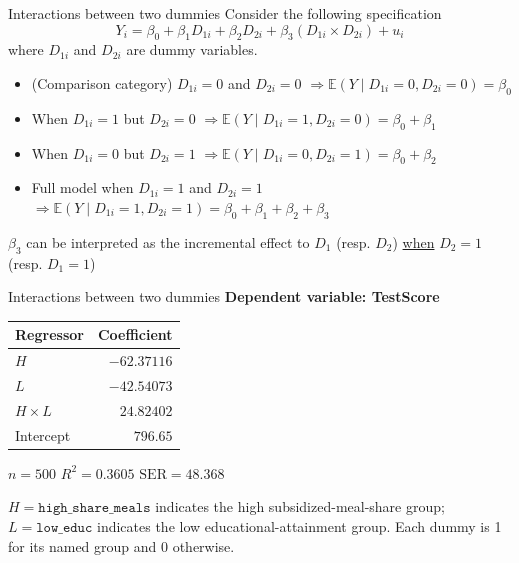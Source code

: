 \documentclass[notes,10pt, aspectratio=169]{beamer}
\begin{document}
\begin{frame}{Interactions between two dummies}
Consider the following specification
\begin{equation*}
    Y_i = \beta_0 + \beta_1 D_{1i} + \beta_2 D_{2i} + \beta_3 (D_{1i} \times D_{2i}) + u_i
\end{equation*}
where $D_{1i}$ and $D_{2i}$ are dummy variables.\\[1em]
\begin{itemize}
    \item (Comparison category) $D_{1i}=0$ and $D_{2i}=0$ $\Rightarrow \mathbb{E}(Y\mid D_{1i}=0, D_{2i}=0) = \beta_0$ 
    \item When $D_{1i}=1$ but $D_{2i}=0$ $\Rightarrow \mathbb{E}(Y\mid D_{1i}=1, D_{2i}=0) = \beta_0 + \beta_1$ 
    \item When $D_{1i}=0$ but $D_{2i}=1$ $\Rightarrow \mathbb{E}(Y\mid D_{1i}=0, D_{2i}=1) = \beta_0 + \beta_2$ 
    \item Full model when $D_{1i}=1$ and $D_{2i}=1$ $\Rightarrow \mathbb{E}(Y\mid D_{1i}=1, D_{2i}=1) = \beta_0 + \beta_1 + \beta_2 + \beta_3$ 
\end{itemize}
\vspace{1em}
$\beta_3$ can be interpreted as the incremental effect to $D_{1}$ (resp. $D_{2}$) \underline{when} $D_{2}=1$ (resp. $D_{1}=1$)
\end{frame}

\begin{frame}{Interactions between two dummies}
\textbf{Dependent variable: TestScore}
\begin{center}
\renewcommand{\arraystretch}{1.2}
\begin{tabular}{lr}
\toprule
Regressor & Coefficient \\
\midrule
$H$ & $-62.37116$ \\
$L$ & $-42.54073$ \\
$H \times L$ & $24.82402$ \\
Intercept & $796.65$ \\
\bottomrule
\end{tabular}

\medskip
$n=500$ \qquad $R^2=0.3605$ \qquad $\mathrm{SER}=48.368$
\end{center}
\small $H=\texttt{high\_share\_meals}$ indicates the high subsidized-meal-share group; $L=\texttt{low\_educ}$ indicates the low educational-attainment group. Each dummy is 1 for its named group and 0 otherwise.
\end{frame}
\end{document}
